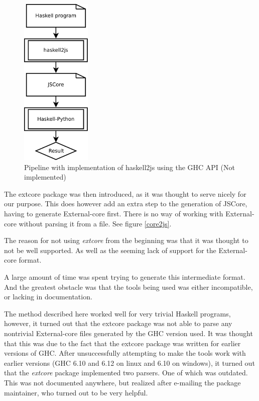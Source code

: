 \begin{figure}[H]
\begin{center}
\includegraphics[width=0.3\textwidth]{diags/pipe_w_haskell2js}
\caption[Pipeline without haskell2js]{Pipeline with implementation of haskell2js using the GHC API (Not implemented)}
\label{haskell2js}
\end{center}
\end{figure}

The extcore package was then introduced, as it was thought to serve nicely for our purpose. This
does however add an extra step to the generation of JSCore, having to generate External-core
first. There is no way of working with External-core without parsing it from a file. 
See figure \ref{core2js}.

The reason for not using \emph{extcore} from the beginning was that it was thought to not be
well supported. As well as the seeming lack of support for the External-core format.


A large amount of time was spent trying to generate this intermediate format. And the
greatest obstacle was that the tools being used was either incompatible, or lacking in
documentation.

The method described here worked well for very trivial Haskell programs, however, 
it turned out that
the extcore package was not able to parse any nontrivial External-core files generated 
by the GHC version used. It was thought that this was due to the fact that the extcore
package was written for earlier versions of GHC. After unsuccessfully attempting to make
the tools work with earlier versions (GHC 6.10 and 6.12 on linux and 6.10 on windows), it
turned out that the \emph{extcore} package implemented two parsers. One of which was outdated.
This was not documented anywhere, but realized after e-mailing the package maintainer, who
turned out to be very helpful.

